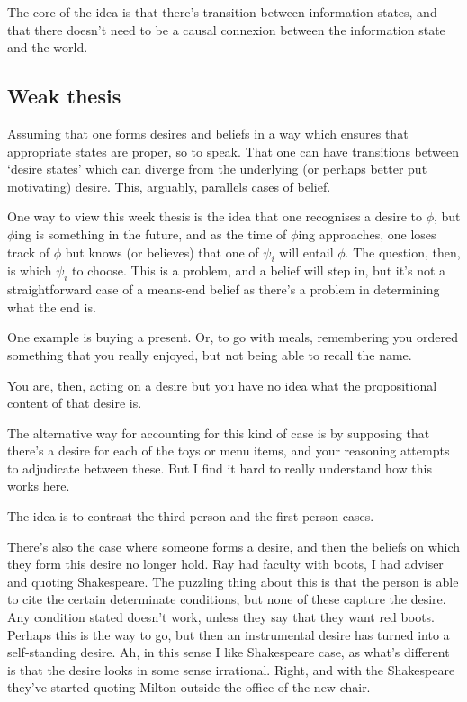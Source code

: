 \documentclass[10pt]{article}
\begin{document}
The core of the idea is that there's transition between information states, and that there doesn't need to be a causal connexion between the information state and the world.


\subsection{Weak thesis}
\label{sec:weak-thesis}

Assuming that one forms desires and beliefs in a way which ensures that appropriate states are proper, so to speak.
That one can have transitions between `desire states' which can diverge from the underlying (or perhaps better put motivating) desire.
This, arguably, parallels cases of belief.

One way to view this week thesis is the idea that one recognises a desire to \(\phi\), but \(\phi\)ing is something in the future, and as the time of \(\phi\)ing approaches, one loses track of \(\phi\) but knows (or believes) that one of \(\psi_{i}\) will entail \(\phi\).
The question, then, is which \(\psi_{i}\) to choose.
This is a problem, and a belief will step in, but it's not a straightforward case of a means-end belief as there's a problem in determining what the end is.

One example is buying a present.
Or, to go with meals, remembering you ordered something that you really enjoyed, but not being able to recall the name.

You are, then, acting on a desire but you have no idea what the propositional content of that desire is.

The alternative way for accounting for this kind of case is by supposing that there's a desire for each of the toys or menu items, and your reasoning attempts to adjudicate between these.
But I find it hard to really understand how this works here.

The idea is to contrast the third person and the first person cases.

There's also the case where someone forms a desire, and then the beliefs on which they form this desire no longer hold.
Ray had faculty with boots, I had adviser and quoting Shakespeare.
The puzzling thing about this is that the person is able to cite the certain determinate conditions, but none of these capture the desire.
Any condition stated doesn't work, unless they say that they want red boots.
Perhaps this is the way to go, but then an instrumental desire has turned into a self-standing desire.
Ah, in this sense I like Shakespeare case, as what's different is that the desire looks in some sense irrational.
Right, and with the Shakespeare they've started quoting Milton outside the office of the new chair.
\end{document}
